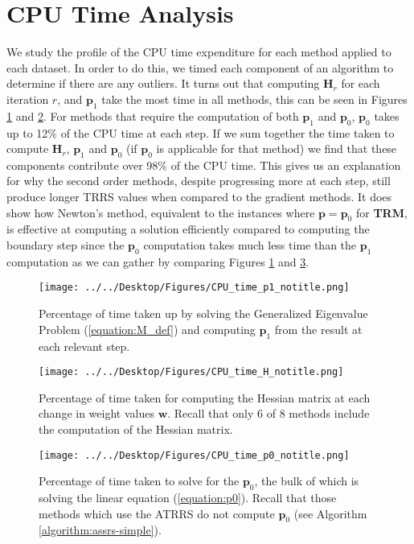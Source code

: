 \documentclass[letterpaper,12pt,titlepage,oneside,final]{book}
\begin{document}
	
	
	\section{CPU Time Analysis}
	We study the profile of the CPU time expenditure for each method applied to each dataset. In order to do this, we timed each component of an algorithm to determine if there are any outliers. It turns out that computing $\mathbf{H}_{r}$ for each iteration $r$, and $\mathbf{p}_{1}$ take the most time in all methods, this can be seen in Figures \ref{figure:p1_time} and \ref{figure:H_time}. For methods that require the computation of both $\mathbf{p}_{1}$ and $\mathbf{p}_{0}$, $\mathbf{p}_{0}$ takes up to 12\% of the CPU time at each step. If we sum together the time taken to compute $\mathbf{H}_{r}$, $\mathbf{p}_{1}$ and $\mathbf{p}_{0}$ (if $\mathbf{p}_{0}$ is applicable for that method) we find that these components contribute over 98\% of the CPU time. This gives us an explanation for why the second order methods, despite progressing more at each step, still produce longer TRRS values when compared to the gradient methods. It does show how Newton's method, equivalent to the instances where $\mathbf{p} = \mathbf{p}_{0}$ for \textbf{TRM}, is effective at computing a solution efficiently compared to computing the boundary step since the $\mathbf{p}_{0}$ computation takes much less time than the $\mathbf{p}_{1}$ computation as we can gather by comparing Figures \ref{figure:p1_time} and \ref{figure:p0_time}.
	\begin{figure}
		\centering
		\texttt{[image: ../../Desktop/Figures/CPU\_time\_p1\_notitle.png]}
		\caption{Percentage of time taken up by solving the Generalized Eigenvalue Problem (\ref{equation:M_def}) and computing $\mathbf{p}_{1}$ from the result at each relevant step.}
		\label{figure:p1_time}
	\end{figure}
	\begin{figure}
		\centering
		\texttt{[image: ../../Desktop/Figures/CPU\_time\_H\_notitle.png]}
		\caption{Percentage of time taken for computing the Hessian matrix at each change in weight values $\mathbf{w}$. Recall that only 6 of 8 methods include the computation of the Hessian matrix. }
		\label{figure:H_time}
	\end{figure}
\begin{figure}
	\centering
	\texttt{[image: ../../Desktop/Figures/CPU\_time\_p0\_notitle.png]}
	\caption{Percentage of time taken to solve for the $\mathbf{p}_{0}$, the bulk of which is solving the linear equation (\ref{equation:p0}). Recall that those methods which use the ATRRS do not compute $\mathbf{p}_{0}$ (see Algorithm \ref{algorithm:assrs-simple}).}
	\label{figure:p0_time}
\end{figure}
	
\end{document}

